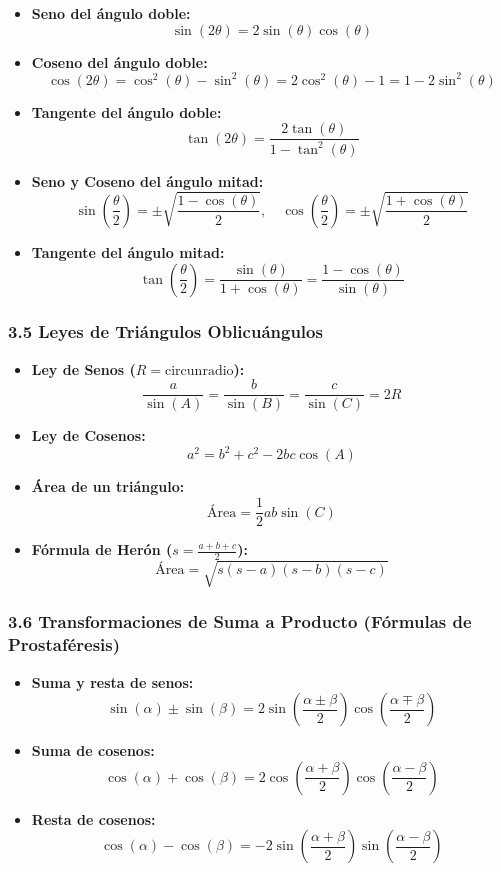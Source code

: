 \documentclass[11pt,a4paper]{article}
\begin{document}
\begin{itemize}
  \item \textbf{Seno del ángulo doble:}
  \[
    \sin(2\theta) = 2\sin(\theta)\cos(\theta)
  \]
  \item \textbf{Coseno del ángulo doble:}
  \[
    \cos(2\theta) = \cos^2(\theta) - \sin^2(\theta) = 2\cos^2(\theta) - 1 = 1 - 2\sin^2(\theta)
  \]
  \item \textbf{Tangente del ángulo doble:}
  \[
    \tan(2\theta) = \frac{2\tan(\theta)}{1 - \tan^2(\theta)}
  \]
  \item \textbf{Seno y Coseno del ángulo mitad:}
  \[
    \sin\left(\frac{\theta}{2}\right) = \pm \sqrt{\frac{1 - \cos(\theta)}{2}}, \quad \cos\left(\frac{\theta}{2}\right) = \pm \sqrt{\frac{1 + \cos(\theta)}{2}}
  \]
  \item \textbf{Tangente del ángulo mitad:}
  \[
    \tan\left(\frac{\theta}{2}\right) = \frac{\sin(\theta)}{1 + \cos(\theta)} = \frac{1 - \cos(\theta)}{\sin(\theta)}
  \]
\end{itemize}

\subsubsection*{3.5 Leyes de Triángulos Oblicuángulos}

\begin{itemize}
  \item \textbf{Ley de Senos ($R = \text{circunradio}$):}
  \[
    \frac{a}{\sin(A)} = \frac{b}{\sin(B)} = \frac{c}{\sin(C)} = 2R
  \]
  \item \textbf{Ley de Cosenos:}
  \[
    a^2 = b^2 + c^2 - 2bc \cos(A)
  \]
  \item \textbf{Área de un triángulo:}
  \[
    \text{Área} = \frac{1}{2} a b \sin(C)
  \]
  \item \textbf{Fórmula de Herón ($s = \frac{a + b + c}{2}$):}
  \[
    \text{Área} = \sqrt{s(s - a)(s - b)(s - c)}
  \]
\end{itemize}

\subsubsection*{3.6 Transformaciones de Suma a Producto (Fórmulas de Prostaféresis)}

\begin{itemize}
  \item \textbf{Suma y resta de senos:}
  \[
    \sin(\alpha) \pm \sin(\beta) = 2 \sin\left(\frac{\alpha \pm \beta}{2}\right) \cos\left(\frac{\alpha \mp \beta}{2}\right)
  \]
  \item \textbf{Suma de cosenos:}
  \[
    \cos(\alpha) + \cos(\beta) = 2 \cos\left(\frac{\alpha + \beta}{2}\right) \cos\left(\frac{\alpha - \beta}{2}\right)
  \]
  \item \textbf{Resta de cosenos:}
  \[
    \cos(\alpha) - \cos(\beta) = -2 \sin\left(\frac{\alpha + \beta}{2}\right) \sin\left(\frac{\alpha - \beta}{2}\right)
  \]
\end{itemize}
\end{document}
